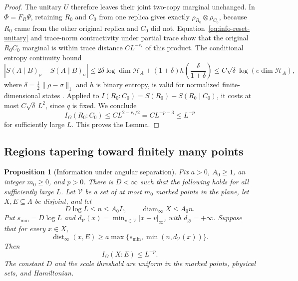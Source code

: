 \documentclass[11pt]{article}
\numberwithin{equation}{section}
\newtheorem{proposition}[theorem]{Proposition}
\theoremstyle{definition}
\theoremstyle{remark}
\begin{document}
\begin{proof}
The unitary $U$ therefore leaves their joint two-copy marginal unchanged.
In $\Phi=F_R\Psi$, retaining $R_0$ and $C_0$ from one replica gives
exactly $\rho_{R_0}\otimes\rho_{C_0}$, because $R_0$ came from the
other original replica and $C_0$ did not.  Equation~\eqref{eq:info-reset-unitary}
and trace-norm contractivity under partial trace show that the original
$R_0C_0$ marginal is within trace distance $CL^{-r_*}$ of this product.
The conditional entropy continuity bound
\[
 |S(A\mid B)_\rho-S(A\mid B)_\sigma|
 \le 2\delta\log\dim\mathcal H_A
       +(1+\delta)h\left(\frac{\delta}{1+\delta}\right)
 \le C\sqrt\delta\log(e\dim\mathcal H_A),
\]
where $\delta=\tfrac12\lVert \rho-\sigma\rVert_1$ and $h$ is binary entropy,
is valid for normalized finite-dimensional states
\cite{Winter2016}.  Applied to $I(R_0:C_0)=S(R_0)-S(R_0\mid C_0)$,
it costs at most $C\sqrt\delta\,L^2$, since $q$ is fixed.  We conclude
\[
 I_\Omega(R_0:C_0)\le CL^{2-r_*/2}=CL^{-p-3}\le L^{-p}
\]
for sufficiently large $L$.  This proves the Lemma.
\end{proof}

\subsection{Regions tapering toward finitely many points}

\begin{proposition}[Information under angular separation]
\label{prop:angular}
Fix $a>0$, $A_0\ge1$, an integer $m_0\ge0$, and $p>0$.
There is $D<\infty$ such that the following holds for all sufficiently
large $L$.  Let $\mathcal V$ be a set of at most $m_0$ marked points
in the plane, let $X,E\subseteq\Lambda$ be disjoint, and let
\[
 D\log L\le n\le A_0L,
 \qquad \operatorname{diam}_\infty X\le A_0n.
\]
Put $s_{\min}=D\log L$ and
$d_{\mathcal V}(x)=\min_{v\in\mathcal V}|x-v|_\infty$, with
$d_{\varnothing}=+\infty$.  Suppose that for every $x\in X$,
\begin{equation}
 \operatorname{dist}_\infty(x,E)
   \ge a\max\{s_{\min},\min(n,d_{\mathcal V}(x))\}.
 \label{eq:info-angular-separation}
\end{equation}
Then
\[
 I_\Omega(X:E)\le L^{-p}.
\]
The constant $D$ and the scale threshold are uniform in the marked
points, physical sets, and Hamiltonian.
\end{proposition}
\end{document}
